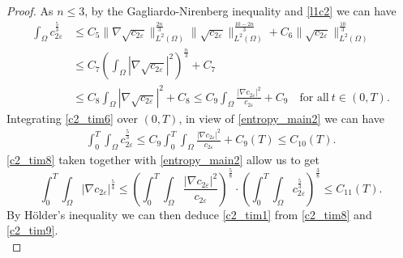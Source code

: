 \documentclass[a4paper,10pt]{article}
\theoremstyle{definition}
\begin{document}
\begin{proof}
\noindent
As $n \leq 3$, by the Gagliardo-Nirenberg inequality and \eqref{l1c2} we can have
\begin{align}
\label{c2_tim6}
  \nonumber\int_\Omega c_{2\varepsilon}^{\frac{5}{3}} & \leq C_5 \|\nabla \sqrt{ c_{2\varepsilon}}\|_{L^2(\Omega)}^{\frac{2n}{3}} \|\sqrt{c_{2\varepsilon}}\|^{\frac{10 - 2n}{3}}_{L^2(\Omega)} + C_6 \|\sqrt{c_{2\varepsilon}}\|^{\frac{10}{3}}_{L^2(\Omega)}                   \\[5pt]
  \nonumber  & \leq C_7 \left(\int_\Omega |\nabla \sqrt{ c_{2\varepsilon}}|^2 \right)^{\frac{n}{3}} + C_7   \\[5pt]
  & \leq C_8 \int_\Omega |\nabla \sqrt{ c_{2\varepsilon}}|^2 + C_8 \leq C_9 \int_\Omega \frac{|\nabla c_{2\varepsilon}|^2}{c_{2\varepsilon}} + C_9 \quad \text{for all} ~ t \in (0, T).
\end{align}
Integrating \eqref{c2_tim6} over $(0,T)$, in view of \eqref{entropy_main2} we can have
\begin{align}
  \label{c2_tim8}
  \int_0^T \int_\Omega c_{2\varepsilon}^{\frac{5}{3}}  \leq C_9 \int_0^T \int_\Omega \frac{|\nabla c_{2\varepsilon}|^2}{c_{2\varepsilon}} + C_9(T) \leq C_{10}(T).
\end{align}
\eqref{c2_tim8} taken together with \eqref{entropy_main2} allow us to get
\begin{equation}
\label{c2_tim9}
  \int_0^T \int_\Omega |\nabla c_{2\varepsilon}|^{\frac{5}{4}} \leq \left(\int_0^T \int_\Omega \frac{|\nabla c_{2\varepsilon}|^2}{c_{2\varepsilon}}\right)^{\frac{5}{8}} \cdot \left(\int_0^T \int_\Omega c_{2\varepsilon}^{\frac{5}{3}}\right)^{\frac{3}{8}} \leq C_{11}(T).
\end{equation}
By H\"{o}lder's inequality we can then deduce \eqref{c2_tim1} from \eqref{c2_tim8} and \eqref{c2_tim9}.\\[-2ex]


\end{proof}
\end{document}
